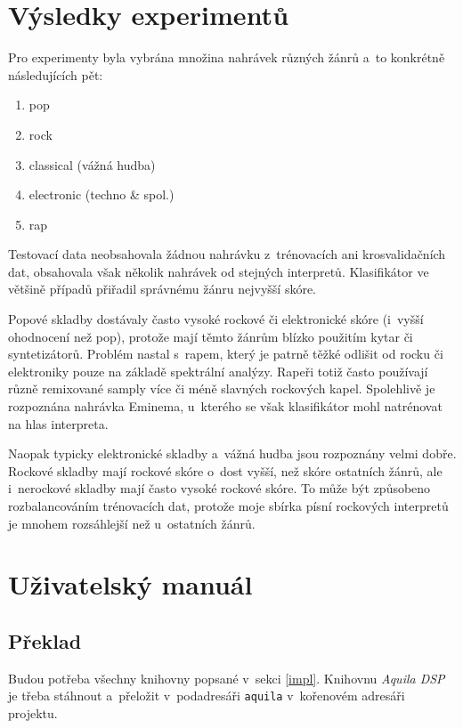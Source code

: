 \documentclass[10pt,a4paper,twocolumn]{article}
\begin{document}
\section{Výsledky experimentů}

Pro experimenty byla vybrána množina nahrávek různých žánrů a~to konkrétně následujících pět:

\begin{enumerate}
\item pop
\item rock
\item classical (vážná hudba)
\item electronic (techno \& spol.)
\item rap
\end{enumerate}

Testovací data neobsahovala žádnou nahrávku z~trénovacích ani krosvalidačních dat,
obsahovala však několik nahrávek od stejných interpretů.
Klasifikátor ve většině případů přiřadil správnému žánru nejvyšší skóre.

Popové skladby dostávaly často vysoké rockové či elektronické skóre (i~vyšší ohodnocení než pop),
protože mají těmto žánrům blízko použitím kytar či syntetizátorů.
Problém nastal s~rapem, který je patrně těžké odlišit od rocku či elektroniky
pouze na základě spektrální analýzy.
Rapeři totiž často používají různě remixované samply více či méně slavných rockových kapel.
Spolehlivě je rozpoznána nahrávka Eminema,
u~kterého se však klasifikátor mohl natrénovat na hlas interpreta.

Naopak typicky elektronické skladby a~vážná hudba jsou rozpoznány velmi dobře.
Rockové skladby mají rockové skóre o~dost vyšší, než skóre ostatních žánrů,
ale i~nerockové skladby mají často vysoké rockové skóre.
To může být způsobeno rozbalancováním trénovacích dat,
protože moje sbírka písní rockových interpretů je mnohem rozsáhlejší
než u~ostatních žánrů.

\section{Uživatelský manuál}

\subsection{Překlad}

Budou potřeba všechny knihovny popsané v~sekci \ref{impl}. Knihovnu \emph{Aquila DSP}
je třeba stáhnout a~přeložit v~pod\-adresáři \verb|aquila| v~kořenovém adresáři projektu.
\end{document}
